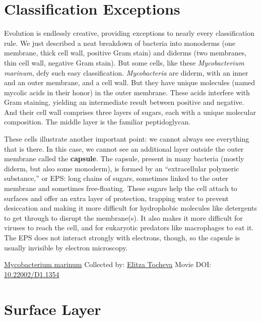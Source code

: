 \documentclass[]{tufte-book}
\begin{document}
\hypertarget{classification-exceptions}{%
\section{Classification Exceptions}\label{classification-exceptions}}

Evolution is endlessly creative, providing exceptions to nearly every classification rule. We just described a neat breakdown of bacteria into monoderms (one membrane, thick cell wall, positive Gram stain) and diderms (two membranes, thin cell wall, negative Gram stain). But some cells, like these \emph{Mycobacterium marinum}, defy such easy classification. \emph{Mycobacteria} are diderm, with an inner and an outer membrane, and a cell wall. But they have unique molecules (named mycolic acids in their honor) in the outer membrane. These acids interfere with Gram staining, yielding an intermediate result between positive and negative. And their cell wall comprises three layers of sugars, each with a unique molecular composition. The middle layer is the familiar peptidoglycan.

These cells illustrate another important point: we cannot always see everything that is there. In this case, we cannot see an additional layer outside the outer membrane called the \textbf{capsule}. The capsule, present in many bacteria (mostly diderm, but also some monoderm), is formed by an ``extracellular polymeric substance,'' or EPS: long chains of sugars, sometimes linked to the outer membrane and sometimes free-floating. These sugars help the cell attach to surfaces and offer an extra layer of protection, trapping water to prevent desiccation and making it more difficult for hydrophobic molecules like detergents to get through to disrupt the membrane(s). It also makes it more difficult for viruses to reach the cell, and for eukaryotic predators like macrophages to eat it. The EPS does not interact strongly with electrons, though, so the capsule is usually invisible by electron microscopy.



\hypertarget{htmlwidget-b38cdca8930773371c91}{}

\label{fig:2-5}\protect\hyperlink{tree}{Mycobacterium marinum} Collected by: \protect\hyperlink{elitza_tocheva}{Elitza Tocheva} Movie DOI: \href{https://doi.org/10.22002/D1.1354}{10.22002/D1.1354}

\hypertarget{surface-layer}{%
\section{Surface Layer}\label{surface-layer}}
\end{document}
